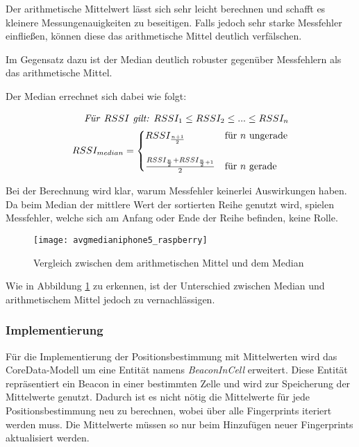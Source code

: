 Der arithmetische Mittelwert lässt sich sehr leicht berechnen und schafft es kleinere Messungenauigkeiten zu beseitigen. Falls jedoch sehr starke Messfehler einfließen, können diese das arithmetische Mittel deutlich verfälschen.

Im Gegensatz dazu ist der Median deutlich robuster gegenüber Messfehlern als das arithmetische Mittel.

Der Median errechnet sich dabei wie folgt: 

\begin{equation}
	\begin{split}
	\text{\emph{Für }}RSSI \text{\emph{ gilt: }} RSSI_{1} \leq RSSI_{2} \leq ... \leq RSSI_{n} \\
	RSSI_{median}=\begin{cases}
	RSSI_{\frac{n+1}{2}} & \text{für } n \text{ ungerade}\\ \\
	\frac{RSSI_{\frac{n}{2}} + RSSI_{\frac{n}{2}+1}}{2} & \text{für } n \text{ gerade} \\
	\end{cases}
	\end{split}
\end{equation}

Bei der Berechnung wird klar, warum Messfehler keinerlei Auswirkungen haben. Da beim Median der mittlere Wert der sortierten Reihe genutzt wird, spielen Messfehler, welche sich am Anfang oder Ende der Reihe befinden, keine Rolle.

\begin{figure}[htb!]
		\centering
	\texttt{[image: avgmedianiphone5\_raspberry]}
	\caption{Vergleich zwischen dem arithmetischen Mittel und dem Median}
	\label{avgmedianiphone5_raspberry}
\end{figure}

Wie in Abbildung \ref{avgmedianiphone5_raspberry} zu erkennen, ist der Unterschied zwischen Median und arithmetischem Mittel jedoch zu vernachlässigen. 

\subsubsection{Implementierung}
\label{sec:implementation:fingerprinting:positioning:avg:implementiation}
Für die Implementierung der Positionsbestimmung mit Mittelwerten wird das CoreData-Modell um eine Entität namens \emph{BeaconInCell} erweitert. Diese Entität repräsentiert ein Beacon in einer bestimmten Zelle und wird zur Speicherung der Mittelwerte genutzt. Dadurch ist es nicht nötig die Mittelwerte für jede Positionsbestimmung neu zu berechnen, wobei über alle Fingerprints iteriert werden muss. Die Mittelwerte müssen so nur beim Hinzufügen neuer Fingerprints aktualisiert werden.

